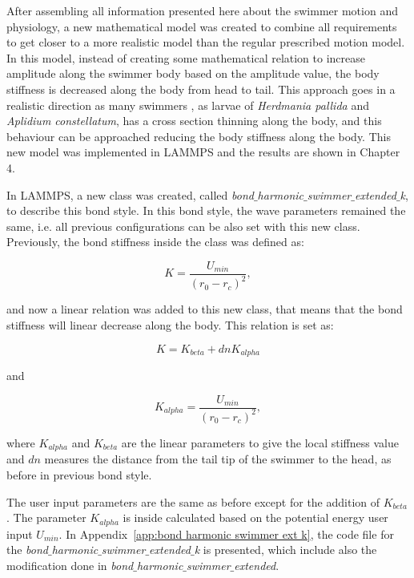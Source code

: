 After assembling all information presented here about the swimmer motion and physiology, a new mathematical model was created to combine all requirements to get closer to a more
realistic model than the regular prescribed motion model. In this model, instead of creating some mathematical relation to increase amplitude along the swimmer body based on the
amplitude value, the body stiffness is decreased along the body from head to tail. This  approach goes in a realistic direction as many swimmers , as larvae of \textit{Herdmania pallida} and
\textit{Aplidium constellatum}, has a cross section thinning along the body, and this behaviour can be approached reducing the body stiffness along the body. This new model was
implemented in LAMMPS and the results are shown in Chapter 4. \par

In LAMMPS, a new class was created, called \textit{bond$\_$harmonic$\_$swimmer$\_$extended$\_$k}, to describe this bond style. In this bond style, the wave parameters remained the same, i.e. all previous configurations can be also set with this new class. 
Previously, the bond stiffness inside the class was defined as:

\begin{equation}
 K = \frac{U_{min}}{( r_{0} - r_{c})^2} ,
\end{equation}

and now a linear relation was added to this new class, that means that the bond stiffness will linear decrease along the body. This relation is set as:

\begin{equation}
 K = K_{beta} + dn K_{alpha}
\end{equation}

and

\begin{equation}
 K_{alpha} = \frac{U_{min}}{( r_{0} - r_{c})^2} ,
\end{equation}


where $K_{alpha}$ and $K_{beta}$ are the linear parameters to give the local stiffness value and $dn$ measures the distance from the tail tip of the swimmer to the head, as before
in previous bond style.\par

The user input parameters are the same as before except for the addition of $K_{beta}$. The parameter $K_{alpha}$ is inside calculated based on the potential energy user
input $U_{min}$. In Appendix~\ref{app:bond harmonic swimmer ext k}, the code file for the \textit{bond$\_$harmonic$\_$swimmer$\_$extended$\_$k} is presented, which include also
the modification done in \textit{bond$\_$harmonic$\_$swimmer$\_$extended}.








